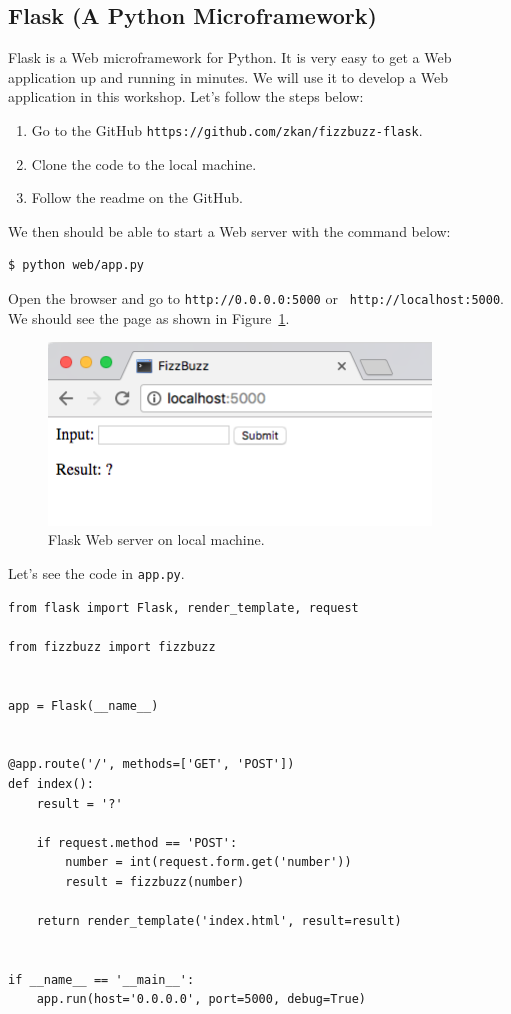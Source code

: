 \documentclass{article}
\begin{document}
\subsection*{Flask (A Python Microframework)}

\noindent Flask is a Web microframework for Python. It is very easy to get a
Web application up and running in minutes. We will use it to develop a Web
application in this workshop. Let's follow the steps below:

\begin{enumerate}
  \item Go to the GitHub {\tt https://github.com/zkan/fizzbuzz-flask}.
  \item Clone the code to the local machine.
  \item Follow the readme on the GitHub.
\end{enumerate}

\noindent We then should be able to start a Web server with the command below:

\begin{verbatim}
$ python web/app.py
\end{verbatim}

\noindent Open the browser and go to {\tt http://0.0.0.0:5000} or {\tt
http://localhost:5000}. We should see the page as shown in
Figure~\ref{fig:flask-web-server-local}. \\

\begin{figure}[t]
  \centering
  \includegraphics[width=4in]{figures/flask-web-server-local}
  \caption{Flask Web server on local machine.}
  \label{fig:flask-web-server-local}
\end{figure}

\noindent Let's see the code in {\tt app.py}.

\begin{verbatim}
from flask import Flask, render_template, request

from fizzbuzz import fizzbuzz


app = Flask(__name__)


@app.route('/', methods=['GET', 'POST'])
def index():
    result = '?'

    if request.method == 'POST':
        number = int(request.form.get('number'))
        result = fizzbuzz(number)

    return render_template('index.html', result=result)


if __name__ == '__main__':
    app.run(host='0.0.0.0', port=5000, debug=True)
\end{verbatim}
\end{document}
